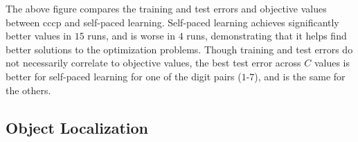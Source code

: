 \documentclass{article}
\newcommand{\mysubsection}[1]{\vspace{-3mm}\subsection{#1}\vspace{-3mm}}
\newcommand{\mycaption}[1]{\vspace{-3mm}\caption{\em \footnotesize #1}\vspace{-3mm}}
\begin{document}

The above figure compares the training and test errors and
objective values between {\sc cccp} and self-paced
learning. Self-paced learning achieves significantly better values in $15$
runs, and is worse in $4$ runs, demonstrating that it
helps find better solutions to the optimization problems. Though 
training and test errors do not necessarily correlate to objective
values, the best test error across $C$ values is better for self-paced
learning for one of the digit pairs ($1$-$7$), and is the same for
the others.

\mysubsection{Object Localization}
\label{subsec:objectLocalize}
\end{document}
